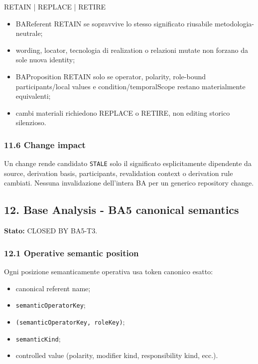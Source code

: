 \documentclass[
  9pt,
  a4paper,
]{article}
\newenvironment{Shaded}{}{}
\newcommand{\NormalTok}[1]{#1}
\providecommand{\tightlist}{%
  \setlength{\itemsep}{0pt}\setlength{\parskip}{0pt}}
\begin{document}
\begin{Shaded}
\begin{Highlighting}[]
\NormalTok{RETAIN | REPLACE | RETIRE}
\end{Highlighting}
\end{Shaded}

\begin{itemize}
\tightlist
\item
  BAReferent RETAIN se sopravvive lo stesso significato riusabile
  metodologia-neutrale;
\item
  wording, locator, tecnologia di realization o relazioni mutate non
  forzano da sole nuova identity;
\item
  BAProposition RETAIN solo se operator, polarity, role-bound
  participants/local values e condition/temporalScope restano
  materialmente equivalenti;
\item
  cambi materiali richiedono REPLACE o RETIRE, non editing storico
  silenzioso.
\end{itemize}

\subsubsection{11.6 Change impact}\label{change-impact}

Un change rende candidato \texttt{STALE} solo il significato
esplicitamente dipendente da source, derivation basis, participants,
revalidation context o derivation rule cambiati. Nessuna invalidazione
dell'intera BA per un generico repository change.

\subsection{12. Base Analysis - BA5 canonical
semantics}\label{base-analysis---ba5-canonical-semantics}

\textbf{Stato:} CLOSED BY BA5-T3.

\subsubsection{12.1 Operative semantic
position}\label{operative-semantic-position}

Ogni posizione semanticamente operativa usa token canonico esatto:

\begin{itemize}
\tightlist
\item
  canonical referent name;
\item
  \texttt{semanticOperatorKey};
\item
  \texttt{(semanticOperatorKey,\ roleKey)};
\item
  \texttt{semanticKind};
\item
  controlled value (polarity, modifier kind, responsibility kind, ecc.).
\end{itemize}
\end{document}
